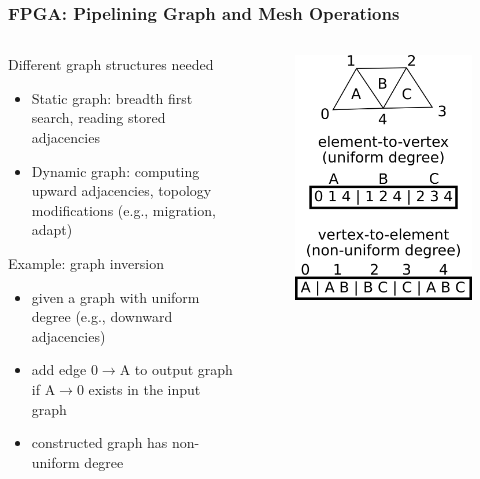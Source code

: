 \documentclass{beamer}
\begin{document}
\begin{frame}
  \frametitle{FPGA: Pipelining Graph and Mesh Operations}
  \begin{columns}
    \begin{column}{0.65\textwidth}
      Different graph structures needed
      \begin{itemize}
        \item Static graph: breadth first search, reading stored adjacencies
        \item Dynamic graph: computing upward adjacencies, topology modifications (e.g., migration, adapt)
      \end{itemize}
      Example: graph inversion
      \begin{itemize}
        \item given a graph with uniform degree (e.g., downward adjacencies)
        \item add edge 0$\rightarrow$A to output graph if A$\rightarrow$0 exists in the input graph
        \item constructed graph has non-uniform degree
      \end{itemize}
    \end{column}
    \begin{column}{0.3\textwidth}
      \begin{figure}
        \centering
        \includegraphics[width=.9\textwidth]{figures/exInvert.png}
      \end{figure}
    \end{column}
  \end{columns}
\end{frame}
\end{document}
